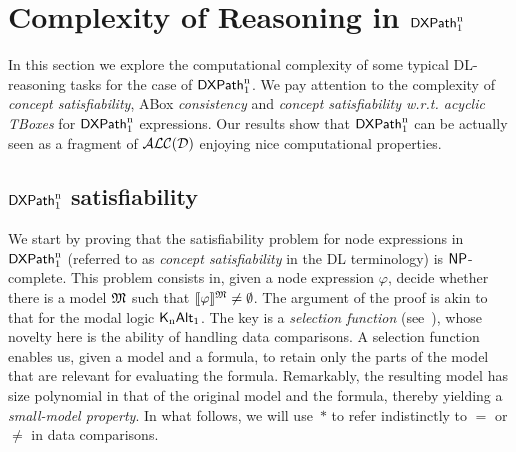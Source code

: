 \section{Complexity of Reasoning in $\mathsf{DXPath}_{\rm 1}^{\rm n}$}
\label{sec:complexity-xpath-f}

In this section we explore the computational complexity of some typical DL-reasoning tasks for the case of $\mathsf{DXPath}_{\rm 1}^{\rm n}$.
We pay attention to the complexity of \emph{concept satisfiability},  ABox \emph{consistency} and \emph{concept satisfiability w.r.t. acyclic TBoxes} for $\mathsf{DXPath}_{\rm 1}^{\rm n}$ expressions. Our results show that $\mathsf{DXPath}_{\rm 1}^{\rm n}$ can be actually seen as a fragment of $\mathcal{ALC(D)}$ enjoying nice computational properties.

\subsection{$\mathsf{DXPath}_{\rm 1}^{\rm n}$ satisfiability}
\label{subsec:xpath-f-sat}

We start by proving that the satisfiability problem for node expressions in $\mathsf{DXPath}_{\rm 1}^{\rm n}$ (referred to as \emph{concept satisfiability} in the DL terminology) is $\textsf{NP}$-complete. This problem consists in, given a node expression $\varphi$, decide whether there is a model $\mathfrak{M}$ such that $\llbracket{\varphi}\rrbracket^{\mathfrak{M}}\neq\emptyset$. 
The argument of the proof is akin to that for the modal logic $\mathsf{K}_{\rm n}\mathsf{Alt}_{\rm 1}$. %
The key is a \emph{selection function} (see~\cite[Th.~6.37]{blackburn2001modal}), whose novelty here is the ability of handling data comparisons. A selection function enables us, given a model and a formula, to retain only the parts of the model that are relevant for evaluating the formula. Remarkably, the resulting model has size polynomial in that of the original model and the formula, thereby yielding a \emph{small-model property}.  
In what follows, we will use~$*$ to refer indistinctly to $=$ or $\neq$ in data comparisons.

